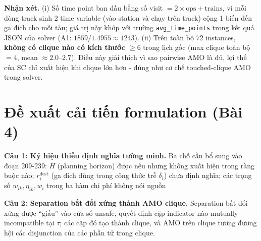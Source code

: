 \documentclass[12pt, a4paper]{article}
\begin{document}
\begin{table}[htbp]
\centering
{}
\caption{Các instance đại diện}
\end{table}

\textbf{Nhận xét.} (i) Số time point ban đầu bằng số visit $= 2 \times \text{ops} + \text{trains}$, vì mỗi dòng track sinh 2 time variable (vào station và chạy trên track) cộng 1 biến đến ga đích cho mỗi tàu; giá trị này khớp với trường \texttt{avg\_time\_points} trong kết quả JSON của solver (A1: $1859 / 1.4955 \approx 1243$). (ii) Trên toàn bộ 72 instances, \textbf{không có clique nào có kích thước $\ge 6$} trong lịch gốc (max clique toàn bộ $= 4$, mean $\approx 2.0$--$2.7$). Điều này giải thích vì sao pairwise AMO là đủ, lợi thế của SC chỉ xuất hiện khi clique lớn hơn - đúng như cơ chế touched-clique AMO trong
solver.

\section{Đề xuất cải tiến formulation (Bài 4)}

\textbf{Câu 1: Ký hiệu thiếu định nghĩa tường minh.} Ba chỗ cần bổ sung vào đoạn
209-239: $H$ (planning horizon) được nêu nhưng không xuất hiện trong ràng buộc nào; $r_i^{\mathrm{dest}}$ (ga đích dùng trong công thức trễ $\delta_i$) chưa định nghĩa; các trọng số $w_{ik}, \eta_{ik}, w_i$ trong ba hàm chi phí không nói nguồn

\textbf{Câu 2: Separation bất đối xứng thành AMO clique.} Separation bất đối xứng được ``giấu'' vào cửa sổ unsafe, quyết định cặp indicator nào mutually incompatible tại $\tau$; các cặp đó tạo thành clique, và AMO trên clique tương đương hội các disjunction của các phần tử trong clique.
\end{document}
